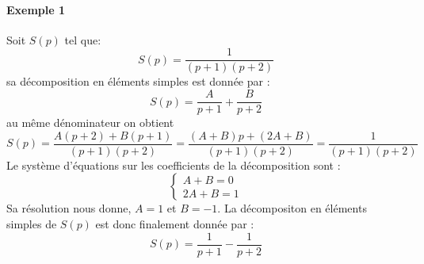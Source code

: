 \paragraph{Exemple 1}
Soit $S(p)$ tel que:
\[
S(p)=\dfrac{1}{(p+1)(p+2)}
\]
sa décomposition en éléments simples est donnée par :
\[
S(p)=\dfrac{A}{p+1}+\dfrac{B}{p+2}
\]
au même dénominateur on obtient
\[
S(p)=\dfrac{A(p+2)+B(p+1)}{(p+1)(p+2)}
    =\dfrac{(A+B)p+(2A+B)}{(p+1)(p+2)}
    =\dfrac{1}{(p+1)(p+2)}
\]
Le système d'équations sur les coefficients de la décomposition sont :
\[
\begin{cases}
    A+B=0\\
    2A+B=1
\end{cases}
\]
Sa résolution nous donne, $A=1$ et $B=-1$.
La décompositon en éléments simples de $S(p)$ est donc finalement donnée 
par :
\[
S(p)=\dfrac{1}{p+1}-\dfrac{1}{p+2}
\]

